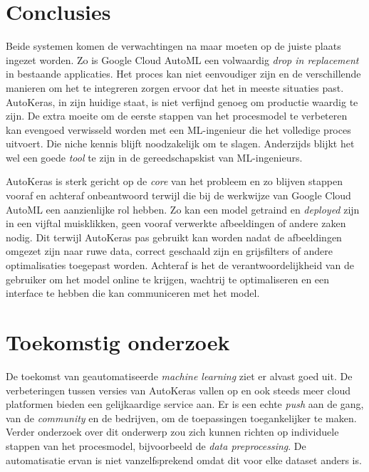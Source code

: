 \documentclass[a0,portrait]{a0poster}
\begin{document}
\begin{multicols}{2}



\color{HoGentAccent1} 
\section*{Conclusies}
\color{black}

Beide systemen komen de verwachtingen na maar moeten op de juiste plaats ingezet worden. Zo is Google Cloud AutoML een volwaardig \textit{drop in replacement} in bestaande applicaties. Het proces kan niet eenvoudiger zijn en de verschillende manieren om het te integreren zorgen ervoor dat het in meeste situaties past. AutoKeras, in zijn huidige staat, is niet verfijnd genoeg om productie waardig te zijn. De extra moeite om de eerste stappen van het procesmodel te verbeteren kan evengoed verwisseld worden met een ML-ingenieur die het volledige proces uitvoert. Die niche kennis blijft noodzakelijk om te slagen. Anderzijds blijkt het wel een goede \textit{tool} te zijn in de gereedschapskist van ML-ingenieurs.

AutoKeras is sterk gericht op de \textit{core} van het probleem en zo blijven stappen vooraf en achteraf onbeantwoord terwijl die bij de werkwijze van Google Cloud AutoML een aanzienlijke rol hebben. Zo kan een model getraind en \textit{deployed} zijn in een vijftal muisklikken, geen vooraf verwerkte afbeeldingen of andere zaken nodig. Dit terwijl AutoKeras pas gebruikt kan worden nadat de afbeeldingen omgezet zijn naar ruwe data, correct geschaald zijn en grijsfilters of andere optimalisaties toegepast worden. Achteraf is het de verantwoordelijkheid van de gebruiker om het model online te krijgen, wachtrij te optimaliseren en een interface te hebben die kan communiceren met het model.

\color{HoGentAccent1} 
\section*{Toekomstig onderzoek}
\color{black}

De toekomst van geautomatiseerde \textit{machine learning} ziet er alvast goed uit. De verbeteringen tussen versies van AutoKeras vallen op en ook steeds meer cloud platformen bieden een gelijkaardige service aan. Er is een echte \textit{push} aan de gang, van de \textit{community} en de bedrijven, om de toepassingen toegankelijker te maken. Verder onderzoek over dit onderwerp zou zich kunnen richten op individuele stappen van het procesmodel, bijvoorbeeld de \textit{data preprocessing}. De automatisatie ervan is niet vanzelfsprekend omdat dit voor elke dataset anders is.



\end{multicols}
\end{document}
